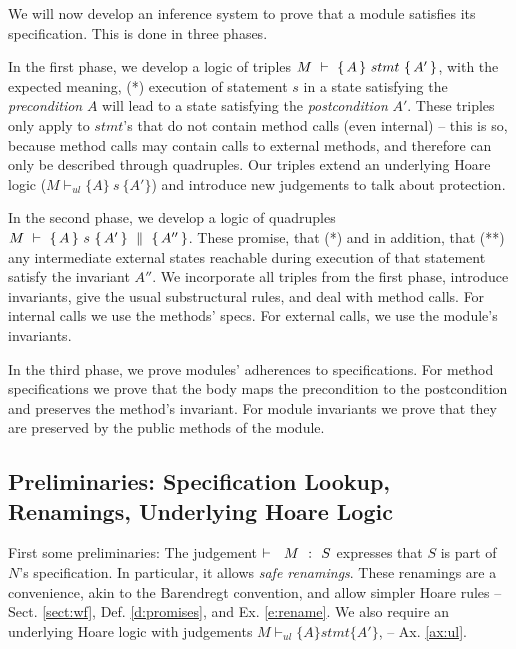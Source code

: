 We will now develop an inference system to prove that a module %
satisfies its specification. This is done in three phases.

In the first phase, we develop a logic of triples ${M\ \vdash\ \{\,A\, \} \ stmt\  \{\,A'\, \} }$,  with %
the expected meaning, \ie 
(*) execution of statement $s$ in a state satisfying {the \emph{precondition}}  $A$ will lead to a state satisfying  {the \emph{postcondition}}  $A'$.
These triples only apply to   $stmt$'s  that  do not contain method calls  (even internal) -- this is so, because method calls may contain calls to external methods, and therefore can only be described through quadruples.
Our triples extend an underlying Hoare logic  (${M \vdash_{ul}  \{A\} {\ s\ } \{A'\} }$) and  introduce new judgements to %
talk about protection.

In the second phase, we develop a logic of quadruples ${M\ \vdash\ \{\,A\, \} \ s\  \{\,A'\, \}\, \,\parallel\,\, \{\, A'' \, \}}$. These promise,  that (*) and  
in addition,   that (**) any intermediate external states reachable during execution of that statement %
 satisfy the invariant  $A''$.  
 We incorporate all triples from the first phase,       
introduce invariants, give the usual substructural rules, and deal with method calls. 
For internal   calls we use the methods' specs. %
For external   calls, we   use %
 the module's invariants. 
 
In the third phase, we prove modules' adherences to  specifications. 
For method specifications we prove that the body maps the precondition to the postcondition and preserves the method's invariant. 
For module invariants we prove that they  are preserved by the public methods of the module.



\subsection{Preliminaries: Specification Lookup,  Renamings, Underlying Hoare Logic}

First some preliminaries: %
The judgement    ${\vdash \ \ M\ \ \mathbf{:}\ \ S}$ expresses that $S$ is part of $N$'s specification.  
In particular, it allows   \emph{safe  renamings}. 
These renamings are   a convenience, akin to the Barendregt convention, and  allow simpler Hoare rules  -- \cf Sect. \ref{sect:wf},
Def. \ref{d:promises}, and Ex. \ref{e:rename}. We also require an underlying Hoare logic with judgements $M \vdash_{ul} \{ A \} stmt \{ A' \}$, 
-- \cf Ax. \ref{ax:ul}.



